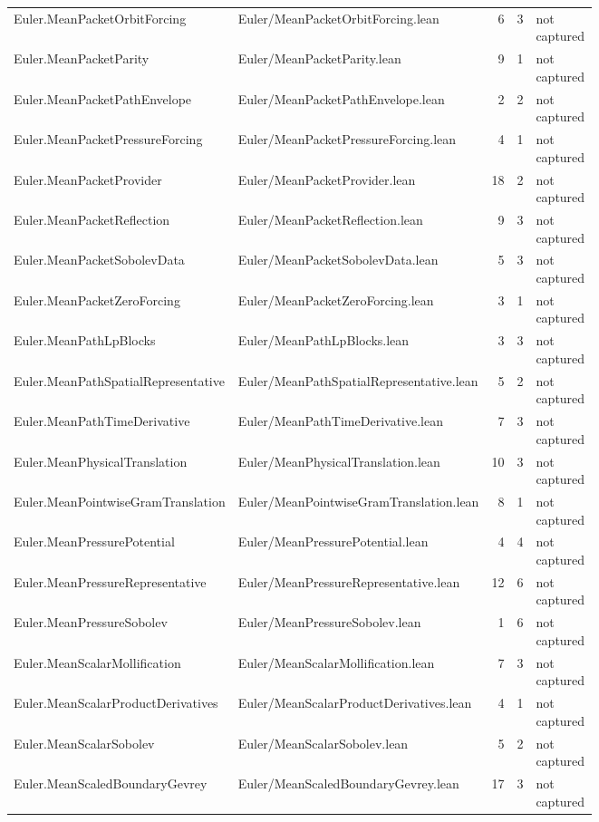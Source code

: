 \documentclass[10pt]{article}
\begin{document}
\begin{longtable}{p{0.28\linewidth}p{0.27\linewidth}r r p{0.20\linewidth}}
Euler.MeanPacketOrbitForcing & Euler/MeanPacketOrbitForcing.lean & 6 & 3 & not captured\\
Euler.MeanPacketParity & Euler/MeanPacketParity.lean & 9 & 1 & not captured\\
Euler.MeanPacketPathEnvelope & Euler/MeanPacketPathEnvelope.lean & 2 & 2 & not captured\\
Euler.MeanPacketPressureForcing & Euler/MeanPacketPressureForcing.lean & 4 & 1 & not captured\\
Euler.MeanPacketProvider & Euler/MeanPacketProvider.lean & 18 & 2 & not captured\\
Euler.MeanPacketReflection & Euler/MeanPacketReflection.lean & 9 & 3 & not captured\\
Euler.MeanPacketSobolevData & Euler/MeanPacketSobolevData.lean & 5 & 3 & not captured\\
Euler.MeanPacketZeroForcing & Euler/MeanPacketZeroForcing.lean & 3 & 1 & not captured\\
Euler.MeanPathLpBlocks & Euler/MeanPathLpBlocks.lean & 3 & 3 & not captured\\
Euler.MeanPathSpatialRepresentative & Euler/MeanPathSpatialRepresentative.lean & 5 & 2 & not captured\\
Euler.MeanPathTimeDerivative & Euler/MeanPathTimeDerivative.lean & 7 & 3 & not captured\\
Euler.MeanPhysicalTranslation & Euler/MeanPhysicalTranslation.lean & 10 & 3 & not captured\\
Euler.MeanPointwiseGramTranslation & Euler/MeanPointwiseGramTranslation.lean & 8 & 1 & not captured\\
Euler.MeanPressurePotential & Euler/MeanPressurePotential.lean & 4 & 4 & not captured\\
Euler.MeanPressureRepresentative & Euler/MeanPressureRepresentative.lean & 12 & 6 & not captured\\
Euler.MeanPressureSobolev & Euler/MeanPressureSobolev.lean & 1 & 6 & not captured\\
Euler.MeanScalarMollification & Euler/MeanScalarMollification.lean & 7 & 3 & not captured\\
Euler.MeanScalarProductDerivatives & Euler/MeanScalarProductDerivatives.lean & 4 & 1 & not captured\\
Euler.MeanScalarSobolev & Euler/MeanScalarSobolev.lean & 5 & 2 & not captured\\
Euler.MeanScaledBoundaryGevrey & Euler/MeanScaledBoundaryGevrey.lean & 17 & 3 & not captured\\

\end{longtable}
\end{document}
